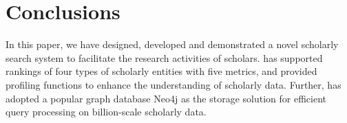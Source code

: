 \section{Conclusions}
\label{sec-conc}

In this paper, we have designed, developed and demonstrated a novel scholarly search system \oursystem to  facilitate the research activities of
scholars. \oursystem has supported rankings of four types of scholarly entities with five metrics, and provided profiling functions to enhance the understanding of scholarly data. Further, \oursystem has adopted a popular graph database Neo4j as the storage solution for efficient query processing on  billion-scale scholarly data.







